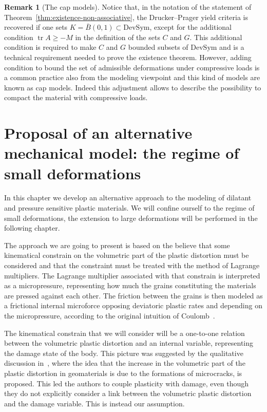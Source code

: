 \documentclass[a4paper,10pt,twoside]{amsbook}
\numberwithin{section}{chapter}
\numberwithin{equation}{chapter}
\theoremstyle{definition}
\newtheorem{rmk}[prop]{Remark}
\DeclareMathOperator{\tr}{tr}
\begin{document}
\begin{rmk}[The cap models]
Notice that, in the notation of the statement of Theorem~\ref{thm:existence-non-associative}, the Drucker--Prager yield criteria is recovered if one sets $K=\bar B(0,1)\subset\text{DevSym}$, except for the additional condition $\tr A\ge-M$ in the definition of the sets $C$ and $G$. This additional condition is required to make $C$ and $G$ bounded subsets of $\text{DevSym}$ and is a technical requirement needed to prove the existence theorem. However, adding condition to bound the set of admissible deformations under compressive loads is a common practice also from the modeling viewpoint and this kind of models are known as cap models. Indeed this adjustment allows to describe the possibility to compact the material with compressive loads.
\end{rmk}

\chapter{Proposal of an alternative mechanical model: the regime of small deformations}
\label{chap:pressure-sensitive-small}

In this chapter we develop an alternative approach to the modeling of dilatant and pressure sensitive plastic materials. We will confine ourself to the regime of small deformations, the extension to large deformations will be performed in the following chapter.

The approach we are going to present is based on the believe that some kinematical constrain on the volumetric part of the plastic distortion must be considered and that the constraint must be treated with the method of Lagrange multipliers. The Lagrange multiplier associated with that constrain is interpreted as a micropressure, representing how much the grains constituting the materials are pressed against each other. The friction between the grains is then modeled as a frictional internal microforce opposing deviatoric plastic rates and depending on the micropressure, according to the original intuition of Coulomb~\cite{Coulomb1776}.

The kinematical constrain that we will consider will be a one-to-one relation between the volumetric plastic distortion and an internal variable, representing the damage state of the body. This picture was suggested by the qualitative discussion in~\cite{micro-geo}, where the idea that the increase in the volumetric part of the plastic distortion in geomaterials is due to the formations of microcracks, is proposed. This led the authors to couple plasticity with damage, even though they do not explicitly consider a link between the volumetric plastic distortion and the damage variable. This is instead our assumption.
\end{document}
